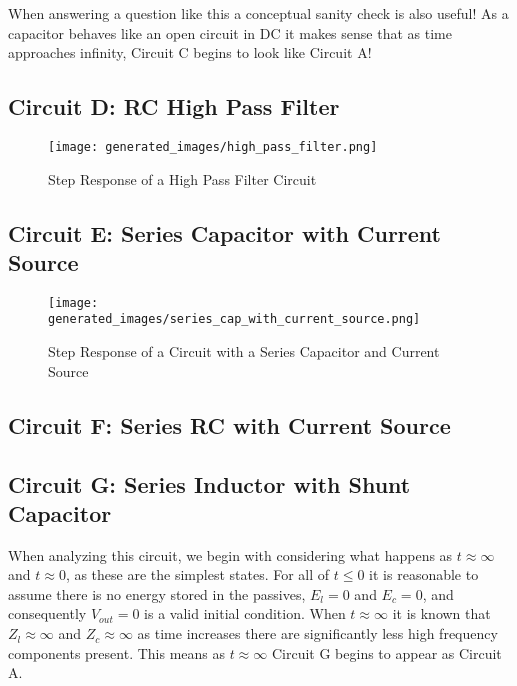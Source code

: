 \documentclass[main.tex]{subfiles}
\begin{document}


When answering a question like this a conceptual sanity check is also useful! As a capacitor behaves like an open circuit in DC it makes sense that as time approaches infinity, Circuit C begins to look like Circuit A! 

\subsection{Circuit D: RC High Pass Filter}

\begin{figure}[H]
    \centering
    \texttt{[image: generated\_images/high\_pass\_filter.png]}
    \caption{Step Response of a High Pass Filter Circuit}
    \label{fig:step-response-high-pass-filter}
\end{figure}


\subsection{Circuit E: Series Capacitor with Current Source}

\begin{figure}[H]
    \centering
    \texttt{[image: generated\_images/series\_cap\_with\_current\_source.png]}
    \caption{Step Response of a Circuit with a Series Capacitor and Current Source}
    \label{fig:step-response-series-cap-with-current-source}
\end{figure}


\subsection{Circuit F: Series RC with Current Source}

\subsection{Circuit G: Series Inductor with Shunt Capacitor}
When analyzing this circuit, we begin with considering what happens as $t \approx \infty$ and $t \approx 0$, as these are the simplest states. For all of $t \leq 0$ it is reasonable to assume there is no energy stored in the passives, $E_l = 0$ and $E_c = 0$, and consequently $V_{out} = 0$ is a valid initial condition. When $t \approx \infty$ it is known that $Z_l \approx \infty$ and $Z_c \approx \infty$ as time increases there are significantly less high frequency components present. This means as $t \approx \infty$ Circuit G begins to appear as Circuit A. 
\end{document}
